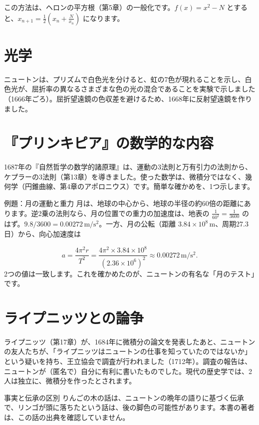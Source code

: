 \documentclass[a4paper,11pt,openany]{ltjsbook}
\begin{document}
この方法は、ヘロンの平方根（第5章）の一般化です。$f(x)=x^2-N$ とすると、$x_{n+1}=\tfrac12\left(x_n+\tfrac N{x_n}\right)$ になります。

\section{光学}

ニュートンは、プリズムで白色光を分けると、虹の7色が現れることを示し、白色光が、屈折率の異なるさまざまな色の光の混合であることを実験で示しました（1666年ごろ）。屈折望遠鏡の色収差を避けるため、1668年に反射望遠鏡を作りました。

\section{『プリンキピア』の数学的な内容}

1687年の『自然哲学の数学的諸原理』は、運動の3法則と万有引力の法則から、ケプラーの3法則（第13章）を導きました。使った数学は、微積分ではなく、幾何学（円錐曲線、第4章のアポロニウス）です。簡単な確かめを、1つ示します。

\begin{examplebox}{例題：月の運動と重力}
月は、地球の中心から、地球の半径の約60倍の距離にあります。逆2乗の法則なら、月の位置での重力の加速度は、地表の $\tfrac1{60^2}=\tfrac1{3600}$ のはず。$9.8/3600=0.00272\,\mathrm{m/s^2}$。一方、月の公転（距離 $3.84\times10^8\,\mathrm{m}$、周期27.3日）から、向心加速度は

\[
a=\frac{4\pi^2r}{T^2}=\frac{4\pi^2\times3.84\times10^8}{(2.36\times10^6)^2}\approx0.00272\,\mathrm{m/s^2}.
\]
2つの値は一致します。これを確かめたのが、ニュートンの有名な「月のテスト」です。
\end{examplebox}

\section{ライプニッツとの論争}

ライプニッツ（第17章）が、1684年に微積分の論文を発表したあと、ニュートンの友人たちが、「ライプニッツはニュートンの仕事を知っていたのではないか」という疑いを持ち、王立協会で調査が行われました（1712年）。調査の報告は、ニュートンが（匿名で）自分に有利に書いたものでした。現代の歴史学では、2人は独立に、微積分を作ったとされます。

\begin{notebox}{事実と伝承の区別}
りんごの木の話は、ニュートンの晩年の語りに基づく伝承で、リンゴが頭に落ちたという話は、後の脚色の可能性があります。本書の著者は、この話の出典を確認していません。
\end{notebox}
\end{document}
